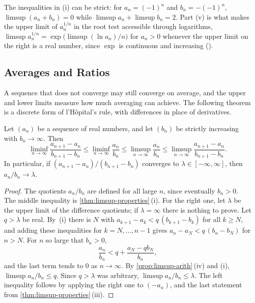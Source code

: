 The inequalities in (i) can be strict: for $a_n=(-1)^n$ and $b_n=-(-1)^n$, $\limsup(a_n+b_n)=0$ while $\limsup a_n+\limsup b_n=2$. Part (v) is what makes the upper limit of $a_n^{1/n}$ in the root test accessible through logarithms, $\limsup a_n^{1/n}=\exp\bigl(\limsup(\ln a_n)/n\bigr)$ for $a_n>0$ whenever the upper limit on the right is a real number, since $\exp$ is continuous and increasing ().

\subsection{Averages and Ratios}

A sequence that does not converge may still converge on average, and the upper and lower limits measure how much averaging can achieve. The following theorem is a discrete form of l'H\^opital's rule, with differences in place of derivatives.

\begin{theorem}
\label{thm:stolz-cesaro}
Let $(a_n)$ be a sequence of real numbers, and let $(b_n)$ be strictly increasing with $b_n\to\infty$. Then
\[
\liminf_{n\to\infty}\frac{a_{n+1}-a_n}{b_{n+1}-b_n}\le\liminf_{n\to\infty}\frac{a_n}{b_n}\le\limsup_{n\to\infty}\frac{a_n}{b_n}\le\limsup_{n\to\infty}\frac{a_{n+1}-a_n}{b_{n+1}-b_n} .
\]
In particular, if $(a_{n+1}-a_n)/(b_{n+1}-b_n)$ converges to $\lambda\in[-\infty,\infty]$, then $a_n/b_n\to\lambda$.
\end{theorem}

\begin{proof}
The quotients $a_n/b_n$ are defined for all large $n$, since eventually $b_n>0$. The middle inequality is \cref{thm:limsup-properties}\,(i). For the right one, let $\lambda$ be the upper limit of the difference quotients; if $\lambda=\infty$ there is nothing to prove. Let $q>\lambda$ be real. By \,(i) there is $N$ with $a_{k+1}-a_k<q\,(b_{k+1}-b_k)$ for all $k\ge N$, and adding these inequalities for $k=N,\ldots,n-1$ gives $a_n-a_N<q\,(b_n-b_N)$ for $n>N$. For $n$ so large that $b_n>0$,
\[
\frac{a_n}{b_n}<q+\frac{a_N-qb_N}{b_n} ,
\]
and the last term tends to $0$ as $n\to\infty$. By \cref{prop:limsup-arith}\,(iv) and (i), $\limsup a_n/b_n\le q$. Since $q>\lambda$ was arbitrary, $\limsup a_n/b_n\le\lambda$. The left inequality follows by applying the right one to $(-a_n)$, and the last statement from \cref{thm:limsup-properties}\,(iii).
\end{proof}

